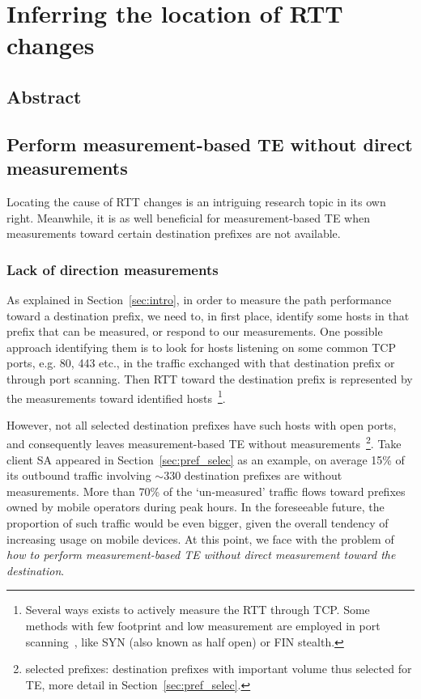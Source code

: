 \chapter{Inferring the location of RTT changes}
\label{sec:infer}
\section*{Abstract}

\section{Perform measurement-based TE without direct measurements}
Locating the cause of RTT changes is an intriguing research topic in its own right.
Meanwhile, it is as well beneficial for measurement-based TE when measurements toward certain destination prefixes are not available.

\subsection{Lack of direction measurements}
As explained in Section~\ref{sec:intro}, in order to measure the path performance toward a destination prefix, we need to, in first place, identify some hosts in that prefix that can be measured, or respond to our measurements.
One possible approach identifying them is to look for hosts listening on some common TCP ports, e.g. 80, 443 etc., in the traffic exchanged with that destination prefix or through port scanning.
Then RTT toward the destination prefix is represented by the measurements toward identified hosts~\footnote{Several ways exists to actively measure the RTT through TCP. Some methods with few footprint and low measurement are employed in port scanning~\cite{nmap}, like SYN (also known as half open) or FIN stealth.}.

However, not all selected destination prefixes have such hosts with open ports, and
consequently leaves measurement-based TE without measurements~\footnote{selected prefixes: destination prefixes with important volume thus selected for TE, more detail in Section~\ref{sec:pref_selec}.}.
Take client SA appeared in Section~\ref{sec:pref_selec} as an example, on average 15\% of its outbound traffic involving $\sim 330$ destination prefixes are without measurements.
More than 70\% of the `un-measured' traffic flows toward prefixes owned by mobile operators during peak hours.
In the foreseeable future, the proportion of such traffic would be even bigger, given the overall tendency of increasing usage on mobile devices.
At this point, we face with the problem of \textit{how to perform measurement-based TE without direct measurement toward the destination}. 

